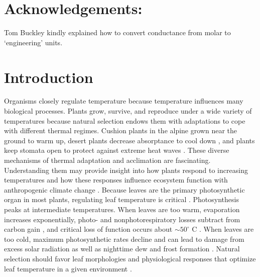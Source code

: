 \documentclass[11pt, oneside]{article}
\newcommand{\pkg}[1]{{\fontseries{b}\selectfont #1}}
\newcommand{\tealeaves}{\pkg{tealeaves}}
\begin{document}
\section*{Acknowledgements:}  

Tom Buckley kindly explained how to convert conductance from molar to `engineering' units.

\clearpage



% 

\section*{Introduction}

Organisms closely regulate temperature because temperature influences many biological processes. Plants grow, survive, and reproduce under a wide variety of temperatures because natural selection endows them with adaptations to cope with different thermal regimes. Cushion plants in the alpine grown near the ground to warm up, desert plants decrease absorptance to cool down \citep{Ehleringer_etal_1976}, and plants keep stomata open to protect against extreme heat waves \citep{Drake_etal_2018}. These diverse mechanisms of thermal adaptation and acclimation are fascinating. Understanding them may provide insight into how plants respond to increasing temperatures and how these responses influence ecosystem function with anthropogenic climate change \citep{Rogers_etal_2017}. Because leaves are the primary photosynthetic organ in most plants, regulating leaf temperature is critical \citep{Berry_Bjorkman_1980}. Photosynthesis peaks at intermediate temperatures\citep{Sage_Kubien_2007}. When leaves are too warm, evaporation increases exponentially, photo- and nonphotorespiratory losses subtract from carbon gain \citep{Jones_2014}, and critical loss of function occurs about $\sim 50^{\circ}$ C \citep{Osullivan_etal_2017}. When leaves are too cold, maximum photosynthetic rates decline and can lead to damage from excess solar radiation \citep{Huner_etal_1993} as well as nighttime dew and frost formation \citep{Jordan_Smith_1994}. Natural selection should favor leaf morphologies and physiological responses that optimize leaf temperature in a given environment \citep{Parkhurst_Loucks_1972, Okajima_etal_2012, Michaletz_etal_2016}.
\end{document}
